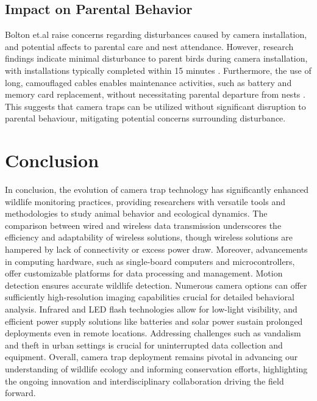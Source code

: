 \documentclass[class=report,11pt,crop=false]{standalone}
\begin{document}
\subsection{Impact on Parental Behavior}

Bolton et.al \cite{bolton2007remote} raise concerns regarding disturbances caused by camera installation, and potential affects to parental care and nest attendance. However, research findings indicate minimal disturbance to parent birds during camera installation, with installations typically completed within 15 minutes \cite{bolton2007remote}. Furthermore, the use of long, camouflaged cables enables maintenance activities, such as battery and memory card replacement, without necessitating parental departure from nests \cite{bolton2007remote}. This suggests that camera traps can be utilized without significant disruption to parental behaviour, mitigating potential concerns surrounding disturbance.

\section{Conclusion}

In conclusion, the evolution of camera trap technology has significantly enhanced wildlife monitoring practices, providing researchers with versatile tools and methodologies to study animal behavior and ecological dynamics. The comparison between wired and wireless data transmission underscores the efficiency and adaptability of wireless solutions, though wireless solutions are hampered by lack of connectivity or excess power draw. Moreover, advancements in computing hardware, such as single-board computers and microcontrollers, offer customizable platforms for data processing and management. Motion detection ensures accurate wildlife detection. Numerous camera options can offer sufficiently high-resolution imaging capabilities crucial for detailed behavioral analysis. Infrared and LED flash technologies allow for low-light visibility, and efficient power supply solutions like batteries and solar power sustain prolonged deployments even in remote locations. Addressing challenges such as vandalism and theft in urban settings is crucial for uninterrupted data collection and equipment. Overall, camera trap deployment remains pivotal in advancing our understanding of wildlife ecology and informing conservation efforts, highlighting the ongoing innovation and interdisciplinary collaboration driving the field forward.

\ifstandalone

\printnoidxglossary[type=\acronymtype,nonumberlist]
\fi
\end{document}
